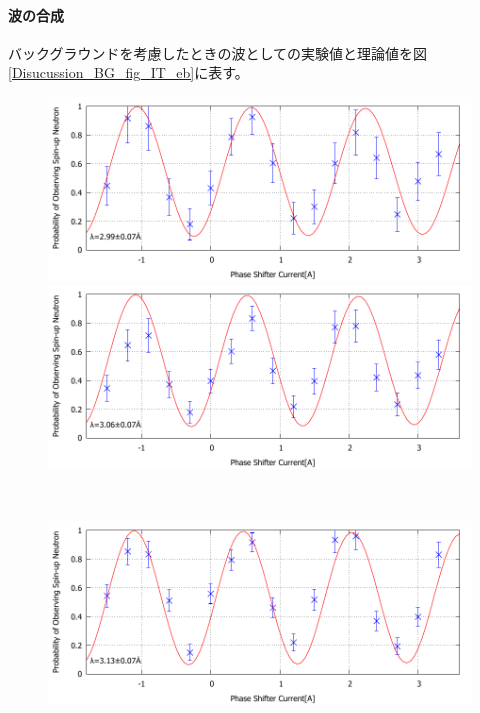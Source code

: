 \paragraph{波の合成}
バックグラウンドを考慮したときの波としての実験値と理論値を図\ref{Disucussion_BG_fig_IT_eb}に表す。
\begin{figure}[H]
\begin{minipage}{0.5\hsize}
\includegraphics[width=\hsize]{discussion/BG/IT_eb_420.pdf}
\end{minipage}
\begin{minipage}{0.5\hsize}
\includegraphics[width=\hsize]{discussion/BG/IT_eb_430.pdf}
\end{minipage}\\
\begin{minipage}{0.5\hsize}
\includegraphics[width=\hsize]{discussion/BG/IT_eb_440.pdf}
\end{minipage}

\end{figure}
